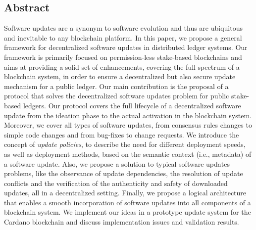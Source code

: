 \subsection*{Abstract}
Software updates are a synonym to software evolution and thus are ubiquitous and inevitable to any blockchain platform. In this paper, we propose a general framework for decentralized software updates in distributed ledger systems. Our framework is primarily focused on permission-less stake-based blockchains and aims at providing a solid set of enhancements, covering the full spectrum of a blockchain system, in order to ensure a decentralized but also secure update mechanism for a public ledger. 
Our main contribution is the proposal of a protocol that solves the decentralized software updates problem for public stake-based ledgers. Our protocol covers the full lifecycle of a decentralized software update from the ideation phase to the actual activation in the blockchain system. Moreover, we cover all types of software updates, from consensus rules changes to simple code changes and from bug-fixes to change requests. We introduce the concept of \emph{update policies}, to describe the need for different deployment speeds, as well as deployment methods, based on the semantic context (i.e., metadata) of a software update. Also, we propose a solution to typical software updates problems, like the observance of update dependencies, the resolution of update conflicts and the verification of the authenticity and safety of downloaded updates, all in a decentralized setting. Finally, we propose a logical architecture that enables a smooth incorporation of software updates into all components of a blockchain system. We implement our ideas in a prototype update system for the Cardano blockchain and discuss implementation issues and validation results.



